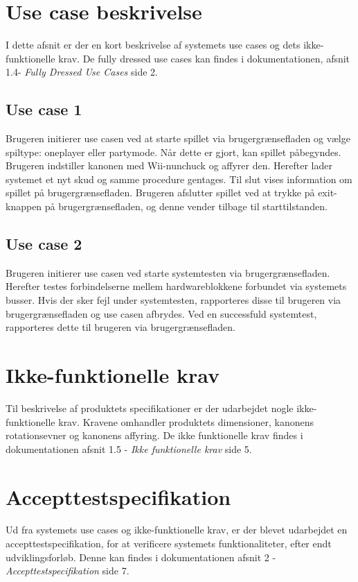 \newpage
\section{Use case beskrivelse}
I dette afsnit er der en kort beskrivelse af systemets use cases og dets ikke-funktionelle krav. De fully dressed use cases kan findes i dokumentationen, afsnit 1.4- \textit{Fully Dressed Use Cases} side 2.

\subsection{Use case 1}
Brugeren initierer use casen ved at starte spillet via brugergrænsefladen og vælge spiltype: oneplayer eller partymode. Når dette er gjort, kan spillet påbegyndes. Brugeren indstiller kanonen med Wii-nunchuck og affyrer den. Herefter lader systemet et nyt skud og samme procedure gentages. Til slut vises information om spillet på brugergrænsefladen. Brugeren afslutter spillet ved at trykke på exit-knappen på brugergrænsefladen, og denne vender tilbage til starttilstanden. 

\subsection{Use case 2}
\label{afsnit:usecasebeskrivelseUC2}
Brugeren initierer use casen ved starte systemtesten via brugergrænsefladen. Herefter testes forbindelserne mellem hardwareblokkene forbundet via systemets busser. Hvis der sker fejl under systemtesten, rapporteres disse til brugeren via brugergrænsefladen og use casen afbrydes. Ved en successfuld systemtest, rapporteres dette til brugeren via brugergrænsefladen.

\section{Ikke-funktionelle krav}
Til beskrivelse af produktets specifikationer er der udarbejdet nogle ikke-funktionelle krav. Kravene omhandler produktets dimensioner, kanonens rotationsevner og kanonens affyring. De ikke funktionelle krav findes i dokumentationen afsnit 1.5 - \textit{Ikke funktionelle krav} side 5.

\section{Accepttestspecifikation}
Ud fra systemets use cases og ikke-funktionelle krav, er der blevet udarbejdet en accepttestspecifikation, for at verificere systemets funktionaliteter, efter endt udviklingsforløb. Denne kan findes i dokumentationen afsnit 2 - \textit{Accepttestspecifikation} side 7. 